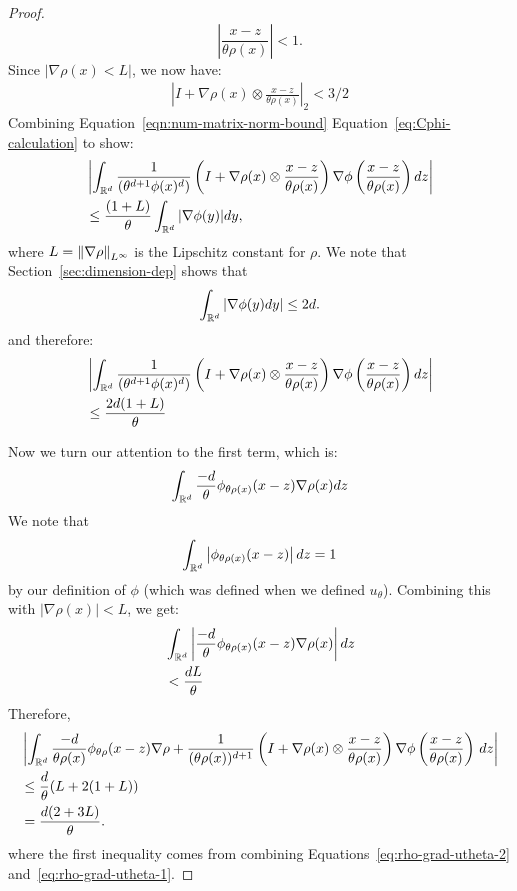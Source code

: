 \begin{proof}
  \[
    \left| \frac{x-z}{\theta \rho(x)}\right| < 1.
  \]
  Since $|\nabla \rho(x) < L|$, we now have:
  \begin{align}\label{eqn:num-matrix-norm-bound}
    |I + \nabla \rho(x) \otimes \frac{x-z}{\theta \rho(x)}|_2 <
    3/2
  \end{align}
  Combining Equation~\ref{eqn:num-matrix-norm-bound} Equation~\ref{eq:Cphi-calculation} to show:
  \begin{align}
    & \left | \int_{\mathbb{R}^d}
    \frac{1}{(\theta^{d+1} \phi(x)^{d})} \left( I + \nabla \rho(x) \otimes \frac{x-z}{\theta \rho(x)}
    \right) \nabla \phi \left( \frac{x-z}{\theta \rho(x)}
    \right) dz \right| 
    \\
    & \leq \frac{(1 + L)}{\theta} \int_{\mathbb{R}^d} |\nabla\phi(y) | dy,
  \end{align}
  where $L = \left\lVert \nabla \rho \right\rVert_{{L^\infty}}$ is the Lipschitz constant for $\rho$. 
  We note that Section~\ref{sec:dimension-dep} shows that 
  \begin{align}
    \int_{\mathbb{R}^d} | \nabla \phi(y) dy| \leq 2d.
  \end{align}
  and therefore:
  \begin{align}
    & \left | \int_{\mathbb{R}^d}
    \frac{1}{(\theta^{d+1} \phi(x)^{d})} \left( I + \nabla \rho(x) \otimes \frac{x-z}{\theta \rho(x)}
    \right) \nabla \phi \left( \frac{x-z}{\theta \rho(x)}
    \right) dz \right| 
    \\ \label{eq:rho-grad-utheta-2}
    & \leq \frac{2d(1+L)}{\theta}
  \end{align}

  Now we turn our attention to the first term, which is:
  \begin{align}
    \int_{\mathbb{R}^d} \frac{-d}{\theta} \phi_{\theta \rho(x)}(x-z)
    \nabla\rho(x) dz
  \end{align}
  We note that 
  \[ 
    \int_{\mathbb{R}^d}\left| \phi_{\theta \rho(x)}(x-z)\right| dz
    = 1
  \]
  by our definition of $\phi$ (which was defined when we defined
      $u_\theta$). Combining this
  with $|\nabla \rho(x)| < L$, we get:
  \begin{align}
    & \int_{\mathbb{R}^d} \left | \frac{-d}{\theta} \phi_{\theta \rho(x)}(x-z)
    \nabla\rho(x) \right| dz
    \\ \label{eq:rho-grad-utheta-1}
    & < \frac{dL}{\theta}
  \end{align}
  Therefore, 
  \begin{align}
  &  \nonumber \left| \int_{\mathbb{R}^d} 
    \frac{-d}{\theta \rho(x)} \phi_{\theta \rho}(x-z) \nabla \rho
    + \frac{1}{(\theta \rho(x))^{d+1}} 
    \left( I 
      + \nabla \rho(x) \otimes \frac{x-z}{\theta \rho(x)} \right)
    \nabla \phi \left(\frac{x-z}{\theta \rho(x)} \right) \, dz
    \right|
    \\
    & \nonumber \leq \frac{d}{\theta}( L + 2(1+L)) 
    \\
  & = \frac{d(2+3L)}{\theta}.
  \label{eqn:}
  \end{align}
  where the first inequality comes from combining
  Equations~\ref{eq:rho-grad-utheta-2}
  and~\ref{eq:rho-grad-utheta-1}.


\end{proof}

